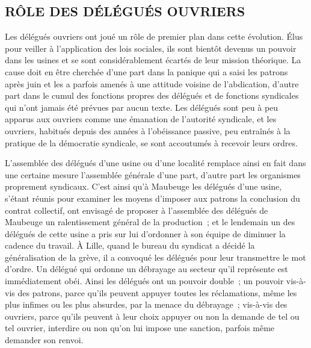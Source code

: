 \documentclass[french,twoside]{book} %
\begin{document}
\subsection[RÔLE DES DÉLÉGUÉS OUVRIERS]{RÔLE DES DÉLÉGUÉS OUVRIERS}
\noindent Les délégués ouvriers ont joué un rôle de premier plan dans cette évolution. Élus pour veiller à l'application des lois sociales, ils sont bientôt devenus un pouvoir dans les usines et se sont considérablement écartés de leur mission théorique. La cause doit en être cherchée d'une part dans la panique qui a saisi les patrons après juin et les a parfois amenés à une attitude voisine de l'abdication, d'autre part dans le cumul des fonctions propres des délégués et de fonctions syndicales qui n'ont jamais été prévues par aucun texte. Les délégués sont peu à peu apparus aux ouvriers comme une émanation de l'autorité syndicale, et les ouvriers, habitués depuis des années à l'obéissance passive, peu entraînés à la pratique de la démocratie syndicale, se sont accoutumés à recevoir leurs ordres.\par
L'assemblée des délégués d'une usine ou d'une localité remplace ainsi en fait dans une certaine mesure l'assemblée générale d'une part, d'autre part les organismes proprement syndicaux. C'est ainsi qu'à Maubeuge les délégués d'une usine, s'étant réunis pour examiner les moyens d'imposer aux patrons la conclusion du contrat collectif, ont envisagé de proposer à l'assemblée des délégués de Maubeuge un ralentissement général de la production ; et le lendemain un des délégués de cette usine a pris sur lui d'ordonner à son équipe de diminuer la cadence du travail. À Lille, quand le bureau du syndicat a décidé la généralisation de la grève, il a convoqué les délégués pour leur transmettre le mot d'ordre. Un délégué qui ordonne un débrayage au secteur qu'il représente est immédiatement obéi. Ainsi les délégués ont un pouvoir double ; un pouvoir vis-à-vis des patrons, parce qu'ils peuvent appuyer toutes les réclamations, même les plus infimes ou les plus absurdes, par la menace du débrayage ; vis-à-vis des ouvriers, parce qu'ils peuvent à leur choix appuyer ou non la demande de tel ou tel ouvrier, interdire ou non qu'on lui impose une sanction, parfois même demander son renvoi.\par
\end{document}
